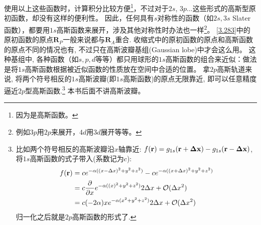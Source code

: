 使用以上这些函数时，计算积分比较方便\footnote{因为是高斯函数。}，不过对于$2s$, $3p$...这些形式的高斯型原初函数，却没有这样的便利性。
因此，任何具有$s$对称性的函数（如$2s,3s$ Slater函数），都要用$1s$高斯函数来展开，涉及其他对称性时办法也一样\footnote{例如$3p$用$2p$来展开，$4d$用$3d$展开等等。}。
\eqref{3.283}中的原初函数的原点$\mathbf{R}_P$一般来说都与$\mathbf{R}_A$重合. 
收缩式中的原初函数的原点和高斯函数的原点不同的情况也有, 不过只在高斯波瓣基组(Gaussian lobe)中才会这么用。
这种基组中, 各种函数（如$s,p,d$等等）都只用球形的$1s$高斯函数的组合来近似：做法是将$1s$高斯函数根据被近似函数的性质放在空间中合适的位置。
拿$2p$高斯轨道来说, 将两个符号相反的$1s$高斯波瓣(即$1s$高斯函数)的原点无限靠近, 即可以任意精度逼近$2p$型高斯函数.\footnote{
	比如两个符号相反的高斯波瓣沿$x$轴靠近: $f(\mathbf{r})=g_{1s}(\mathbf{r}+\mathbf{\Delta x})-g_{1s}(\mathbf{r}-\mathbf{\Delta x})$, 
	将$1s$高斯函数的式子带入(系数记为$c$):
	\begin{align*}
		f(\mathbf{r}) & = ce^{-\alpha((x-\Delta x)^2+y^2+z^2)}-
		ce^{-\alpha((x+\Delta x)^2+y^2+z^2)}\\
		& = c\frac{\partial}{\partial x}e^{-\alpha((x)^2+y^2+z^2)}2\Delta x +\mathcal{O}(\Delta x^2)\\
		& = c(-2\alpha) xe^{-\alpha(x^2+y^2+z^2)}2\Delta x +\mathcal{O}(\Delta x^2)
	\end{align*}
	归一化之后就是$2p$高斯函数的形式了.
}
本书后面不讲高斯波瓣。


